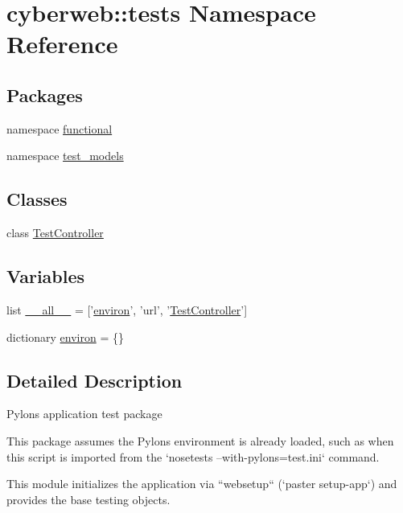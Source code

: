 \hypertarget{namespacecyberweb_1_1tests}{\section{cyberweb\-:\-:tests \-Namespace \-Reference}
\label{namespacecyberweb_1_1tests}
}
\subsection*{\-Packages}
\begin{DoxyCompactItemize}
\item 
namespace \hyperlink{namespacecyberweb_1_1tests_1_1functional}{functional}
\item 
namespace \hyperlink{namespacecyberweb_1_1tests_1_1test__models}{test\-\_\-models}
\end{DoxyCompactItemize}
\subsection*{\-Classes}
\begin{DoxyCompactItemize}
\item 
class \hyperlink{classcyberweb_1_1tests_1_1_test_controller}{\-Test\-Controller}
\end{DoxyCompactItemize}
\subsection*{\-Variables}
\begin{DoxyCompactItemize}
\item 
list \hyperlink{namespacecyberweb_1_1tests_a1eaf7ae369e94b3a5ada80b3a71f55e5}{\-\_\-\-\_\-all\-\_\-\-\_\-} = \mbox{[}'\hyperlink{namespacecyberweb_1_1tests_a9c7e581447f8cbf5f2a6ce39f160ad9e}{environ}', 'url', '\hyperlink{classcyberweb_1_1tests_1_1_test_controller}{\-Test\-Controller}'\mbox{]}
\item 
dictionary \hyperlink{namespacecyberweb_1_1tests_a9c7e581447f8cbf5f2a6ce39f160ad9e}{environ} = \{\}
\end{DoxyCompactItemize}


\subsection{\-Detailed \-Description}
\begin{DoxyVerb}Pylons application test package

This package assumes the Pylons environment is already loaded, such as
when this script is imported from the `nosetests --with-pylons=test.ini`
command.

This module initializes the application via ``websetup`` (`paster
setup-app`) and provides the base testing objects.
\end{DoxyVerb}
 

